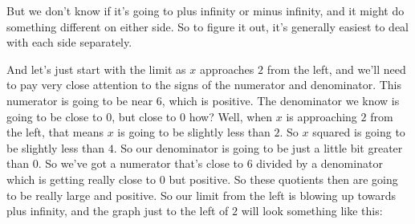 \documentclass[pdftex, brazil, 12pt, twoside]{article}
\begin{document}
\begin{figure}[H]
  \begin{center}
  \end{center}
\end{figure}

But we don't know if it's going to plus infinity
or minus infinity, and it might do something different
on either side.
So to figure it out, it's generally easiest
to deal with each side separately.

And let's just start with the limit
as $x$ approaches $2$ from the left, and we'll
need to pay very close attention to the signs of the numerator
and denominator.
This numerator is going to be near $6$, which is positive.
The denominator we know is going to be close to $0$,
but close to $0$ how?
Well, when $x$ is approaching $2$ from the left,
that means $x$ is going to be slightly less than $2$.
So $x$ squared is going to be slightly less than $4$.
So our denominator is going to be just a little bit greater
than $0$.
So we've got a numerator that's close to $6$
divided by a denominator which is getting really close to $0$
but positive.
So these quotients then are going
to be really large and positive.
So our limit from the left is blowing up
towards plus infinity, and the graph just to the left of $2$
will look something like this:
\end{document}
